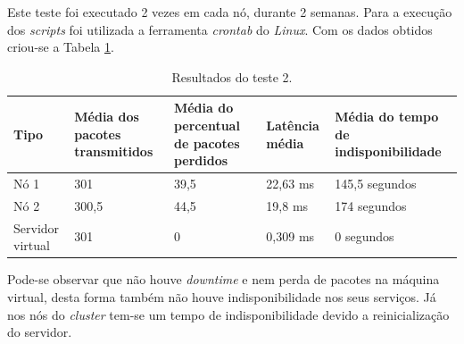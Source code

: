 Este teste foi executado 2 vezes em cada nó, durante 2 semanas. Para a execução dos \textit{scripts} foi utilizada a ferramenta 
\textit{crontab} do \textit{Linux}. Com os dados obtidos criou-se a Tabela \ref{tab:teste2resultados}.


\begin{table}[h!]
\caption{Resultados do teste 2.}
\label{tab:teste2resultados}
\begin{center}
\begin{tabular}{|l|p{2.5cm}|p{2.5cm}|p{1.5cm}|p{3cm}|}\hline
\textbf{Tipo} & \textbf{Média dos pacotes transmitidos} & \textbf{Média do percentual de pacotes perdidos} & \textbf{Latência média} & \textbf{Média do tempo de indisponibilidade} \\\hline
Nó 1 & 301 & 39,5 & 22,63 ms & 145,5 segundos \\\hline
Nó 2 & 300,5 & 44,5 & 19,8 ms & 174 segundos\\\hline
Servidor virtual & 301 & 0 & 0,309 ms & 0 segundos \\\hline
\end{tabular}
\end{center}
\end{table}

Pode-se observar que não houve \textit{downtime} e nem perda de pacotes na máquina virtual, desta forma também não houve indisponibilidade nos 
seus serviços. Já nos nós do \textit{cluster} tem-se um tempo de indisponibilidade devido a reinicialização do servidor.


